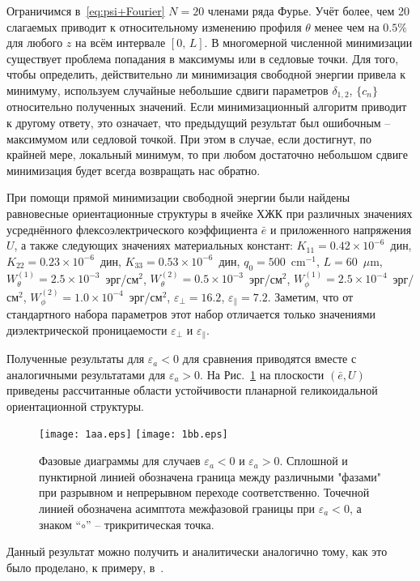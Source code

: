 Ограничимся в~\eqref{eq:psi+Fourier} $N = 20$ членами ряда Фурье.
Учёт более, чем 20 слагаемых приводит к относительному изменению профиля $\theta$ менее чем на $0.5\%$ для любого $z$ на всём интервале $[0,\, L]$.
В многомерной численной минимизации существует проблема попадания в максимумы или в седловые точки.
Для того, чтобы определить, действительно ли минимизация свободной энергии привела к минимуму, используем случайные небольшие сдвиги параметров  $\delta_{1,2}$, $\{c_n\}$ относительно полученных значений.
Если минимизационный алгоритм приводит к другому ответу, это означает, что предыдущий результат был ошибочным -- максимумом или седловой точкой.
При этом в случае, если достигнут, по крайней мере, локальный минимум, то при любом достаточно небольшом сдвиге минимизация будет всегда возвращать нас обратно.

При помощи прямой минимизации свободной энергии были найдены равновесные ориентационные структуры в ячейке ХЖК при различных значениях усреднённого флексоэлектрического коэффициента $\bar{e}$ и приложенного напряжения $U$, а также следующих значениях материальных констант: $K_{11}=0.42\times 10^{-6}$~дин, $K_{22}=0.23\times 10^{-6}$~дин, $K_{33}=0.53\times 10^{-6}$~дин,  $q_0=500$~$\text{cm}^{-1}$, $L=60$~$\mu\text{m}$, $W_\theta^{(1)}=2.5\times 10^{-3}$~эрг/см$^2$, $W_\theta^{(2)}=0.5\times 10^{-3}$~эрг/см$^2$,  $W_\phi^{(1)}=2.5\times 10^{-4}$~эрг/см$^2$, $W_\phi^{(2)}=1.0\times 10^{-4}$~эрг/см$^2$, $\varepsilon_\bot=16.2$, $\varepsilon_\|=7.2$.
Заметим, что от стандартного набора параметров этот набор отличается только значениями диэлектрической проницаемости $\varepsilon_\bot$ и $\varepsilon_\|$.

Полученные результаты для $\varepsilon_a < 0$ для сравнения приводятся вместе с аналогичными результатами для $\varepsilon_a > 0$. На Рис.~\ref{fig1} на плоскости $(\bar{e},U)$ приведены рассчитанные области устойчивости планарной геликоидальной ориентационной структуры.
\begin{figure}
	\centering
	\texttt{[image: 1aa.eps]}%
	\hfill
	\texttt{[image: 1bb.eps]}%
	\caption{Фазовые диаграммы для случаев $\varepsilon_a < 0$ и $\varepsilon_a > 0$. Сплошной и пунктирной линией обозначена граница между различными "фазами" при разрывном и непрерывном переходе соответственно.
		Точечной линией обозначена асимптота межфазовой границы при $\varepsilon_a < 0$, а знаком ``$\circ$'' -- трикритическая точка.}\label{fig1}
\end{figure}
Данный результат можно получить и аналитически аналогично тому, как это было проделано, к примеру, в~\cite{OskirkoPRE2018}.


